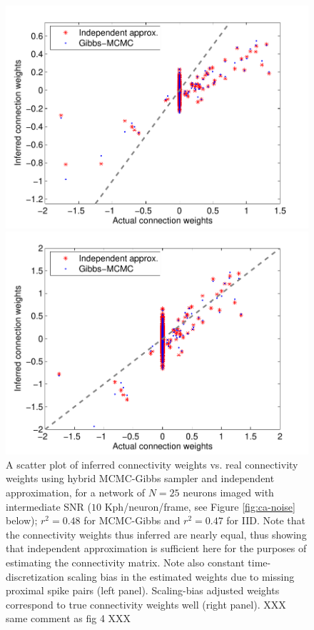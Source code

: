 \begin{figure}[h]
\centering
\begin{minipage}[c]{0.45\hsize}
\includegraphics[width=\hsize]{../figs/Figure1_fluor_mcmc_vs_iid}
\end{minipage}
\begin{minipage}[c]{0.45\hsize}
\includegraphics[width=\hsize]{../figs/Figure1b_fluor_mcmc_vs_iid}
\end{minipage}
\caption{A scatter plot of inferred connectivity weights vs. real connectivity weights
using hybrid MCMC-Gibbs sampler and independent approximation, for a network of $N=25$ neurons imaged
with intermediate SNR ($10$ Kph/neuron/frame, see Figure \ref{fig:ca-noise} below); $r^2=0.48$ for MCMC-Gibbs and
$r^2=0.47$ for IID. Note that the connectivity weights thus inferred are nearly equal, thus showing that independent approximation is sufficient here for the purposes of estimating the connectivity matrix. Note also constant time-discretization scaling bias in the estimated weights due to missing proximal spike pairs (left panel). 
Scaling-bias adjusted weights correspond to true connectivity weights well (right panel). XXX same comment as fig 4 XXX}
\label{fig:mcmc-iid}
\end{figure}

